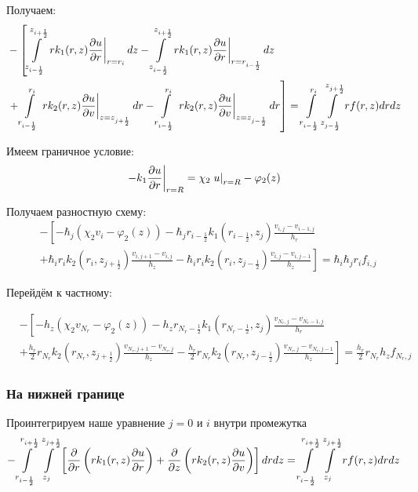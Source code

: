Получаем:
\begin{align*}
  &- \left [
   \int\limits^{z_{i+\frac{1}{2}}}_{z_{i-\frac{1}{2}}}  \left . r k_1(r, z) \pdv{u}{r} \right \vert_{r = r_{i}} dz
  - \int\limits^{z_{i+\frac{1}{2}}}_{z_{i-\frac{1}{2}}} \left . r k_1(r, z) \pdv{u}{r} \right \vert_{r = r_{i - \frac{1}{2}}} dz
  \right . \\
  &\left . + \int\limits^{r_{i}}_{r_{i-\frac{1}{2}}} \left . rk_2(r, z)\pdv{u}{v} \right \vert_{z = z_{j + \frac{1}{2}}} dr
  - \int\limits^{r_{i}}_{r_{i-\frac{1}{2}}} \left . rk_2(r, z)\pdv{u}{v} \right \vert_{z = z_{j - \frac{1}{2}}} dr
  \right ] = \int\limits^{r_{i }}_{r_{i -\frac{1}{2}}} \int\limits^{z_{j +\frac{1}{2}}}_{z_{j -\frac{1}{2}}} rf(r, z) dr dz
\end{align*}

Имеем граничное условие:
\[
  \left . -k_1 \pdv{u}{r} \right \vert_{r=R} = \chi_2 \left . u \right \vert_{r=R} - \varphi_2(z)
\]

Получаем разностную схему:
\begin{align*}
  &- \left [ 
  -\hbar_j ( \chi_2 v_i - \varphi_2(z))
  - \hbar_j r_{i-\frac{1}{2}} k_1(r_{i-\frac{1}{2}}, z_j) \frac{v_{i, j} - v_{i - 1, j}}{h_{r}}
  \right . \\
  &\left .
  + \hbar_i r_{i} k_2(r_i, z_{j+\frac{1}{2}}) \frac{v_{i, j + 1} - v_{i, j}}{h_{z}}
  - \hbar_i r_{i} k_2(r_i, z_{j-\frac{1}{2}}) \frac{v_{i, j} - v_{i, j - 1}}{h_z}
  \right ]  = \hbar_i \hbar_j r_i f_{i, j}
\end{align*}

Перейдём к частному:

\begin{align*}
  &- \left [ 
  -h_z ( \chi_2 v_{N_r} - \varphi_2(z))
  - h_z r_{N_r-\frac{1}{2}} k_1(r_{N_r-\frac{1}{2}}, z_j) \frac{v_{N_r, j} - v_{N_r - 1, j}}{h_{r}}
  \right . \\
  &\left .
  + \frac{h_r}{2} r_{N_r} k_2(r_{N_r}, z_{j+\frac{1}{2}}) \frac{v_{N_r, j + 1} - v_{N_r, j}}{h_{z}}
  - \frac{h_r}{2} r_{N_r} k_2(r_{N_r}, z_{j-\frac{1}{2}}) \frac{v_{N_r, j} - v_{N_r, j - 1}}{h_z}
  \right ]  = \frac{h_r}{2} r_{N_r} h_z f_{N_r, j}
\end{align*}

\subsubsection{На нижней границе}
Проинтегрируем наше уравнение $ j = 0 $ и $ i $ внутри промежутка
\[
  - \int\limits^{r_{i +\frac{1}{2}}}_{r_{i -\frac{1}{2}}} \int\limits^{z_{j +\frac{1}{2}}}_{z_{j }} \left [ \pdv{}{r} \left ( r k_1(r, z) \pdv{u}{r} \right ) 
  + \pdv{}{z} \left ( rk_2(r, z)\pdv{u}{v} \right ) \right ] drdz = \int\limits^{r_{i +\frac{1}{2}}}_{r_{i -\frac{1}{2}}} \int\limits^{z_{j +\frac{1}{2}}}_{z_{j }} rf(r, z) dr dz
\]

